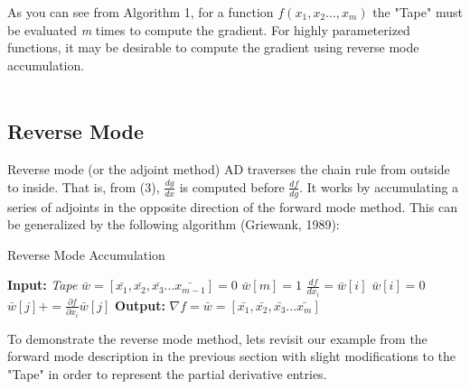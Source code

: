 \documentclass[12pt,a4paper]{article}
\begin{document}
As you can see from Algorithm 1, for a function $f(x_1,x_2..., x_m)$ the "Tape" must be evaluated \textit{m} times to compute the gradient. For highly parameterized functions, it may be desirable to compute the gradient using reverse mode accumulation.
\\
\\
\subsection{Reverse Mode}
Reverse mode (or the adjoint method) AD traverses the chain rule from outside to inside. That is, from (3),  \textit{$\frac{dg}{dx}$} is computed before \textit{$\frac{df}{dg}$}. It works by accumulating a series of adjoints in the opposite direction of the forward mode method. This can be generalized by the following algorithm (Griewank, 1989):
\begin{algorithm*}
  \caption{Reverse Mode Accumulation}
  \begin{algorithmic}[1]
\State \textbf{Input:} \textit{Tape} 
\State $\bar{w} = [\bar{ x_1},\bar{x_2},\bar{x_3}...\bar{x_{m-1}}] = 0$ 
\State $\bar{w}[m] = 1$
\State $\frac{df}{dx_i}=\bar{w}[i]$
\State $\bar{w}[i] = 0$
\State $\bar{w}[j] +=  \frac{\partial f}{\partial x_i}\bar{w}[j]$
\EndFor
\EndFor
\State \textbf{Output:} $\nabla f = \bar{w} =  [\bar{ x_1},\bar{x_2},\bar{x_3}...\bar{x_{m}}]$
\end{algorithmic}
 \end{algorithm*}
 
To demonstrate the reverse mode method, lets revisit our example from the forward mode description in the previous section with slight modifications to the "Tape" in order to represent the partial derivative entries. \\
\end{document}
